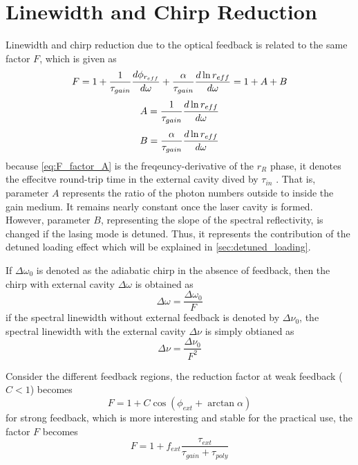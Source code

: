 \section{Linewidth and Chirp Reduction}\label{sec:linewidth_and_chirp_reduction}
Linewidth and chirp reduction due to the optical feedback is related to the same factor $F$, which is given as \cite{kazarinov1987relation}
\begin{equation}
    F=1+\frac{1}{\tau_{gain}}\dv{\phi_{r_{eff}}}{\omega}+\frac{\alpha}{\tau_{gain}}\dv{\ln{r_{eff}}}{\omega}=1+A+B
    \label{eq:F_factor}
\end{equation}
\begin{equation}
    A=\frac{1}{\tau_{gain}}\dv{\ln{r_{eff}}}{\omega}
    \label{eq:F_factor_A}
\end{equation}
\begin{equation}
    B=\frac{\alpha}{\tau_{gain}}\dv{\ln{r_{eff}}}{\omega}
    \label{eq:F_factor_B}
\end{equation}
because \autoref{eq:F_factor_A} is the freqeuncy-derivative of the $r_R$ phase, it denotes the effecitve round-trip time in the external cavity dived by $\tau_{in}$ \cite{}. That is, parameter $A$ represents the ratio of the photon numbers outside to inside the gain medium. It remains nearly constant once the laser cavity is formed. However, parameter $B$, representing the slope of the spectral reflectivity, is changed if the lasing mode is detuned. Thus, it represents the contribution of the detuned loading effect which will be explained in \autoref{sec:detuned_loading}.

If $\Delta\omega_0$ is denoted as the adiabatic chirp in the absence of feedback, then the chirp with external cavity $\Delta\omega$ is obtained as \cite{kazarinov1987relation}
\begin{equation}
    \Delta\omega=\frac{\Delta\omega_0}{F}
\end{equation}
if the spectral linewidth without external feedback is denoted by $\Delta\nu_0$, the spectral linewidth with the external cavity $\Delta\nu$ is simply obtianed as \cite{}
\begin{equation}
    \Delta\nu=\frac{\Delta\nu_0}{F^2}
\end{equation}

Consider the different feedback regions, the reduction factor at weak feedback ($C<1$) becomes
\begin{equation}
    F=1+C\cos(\phi_{ext}+\arctan\alpha)
    \label{F_weak_feedback}
\end{equation}
for strong feedback, which is more interesting and stable for the practical use, the factor $F$ becomes
\begin{equation}
    F=1+f_{ext}\frac{\tau_{ext}}{\tau_{gain}+\tau_{poly}}
    \label{F_strogn_feedback}
\end{equation}

